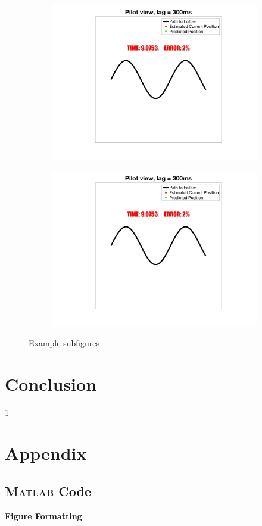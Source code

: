 \documentclass{article}
\begin{document}
\begin{figure}[H]
\begin{subfigure}[b]{0.5\textwidth}
				\centering
				\includegraphics[width=\textwidth]{Figures/Example}
			\end{subfigure}
			\hfill
			\begin{subfigure}[b]{0.5\textwidth}
				\centering
				\includegraphics[width=\textwidth]{Figures/Example}
			\end{subfigure}
			\caption{Example subfigures}
			\label{subfig}
		\end{figure}

\newpage

\section{Conclusion}

\newpage
{}
\setcounter{page}1



\newpage
\section{Appendix}
\subsection{\textsc{Matlab} Code}

\noindent\textbf{Figure Formatting}


\end{document}
